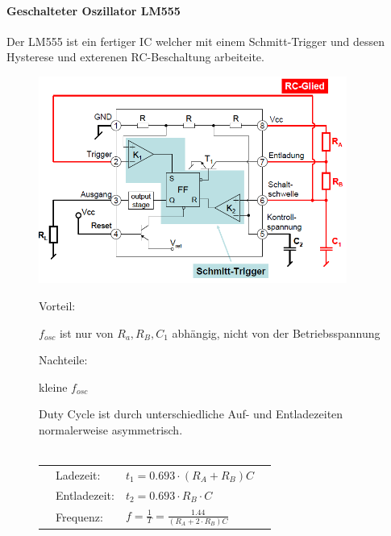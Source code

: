 \FloatBarrier
\paragraph{Geschalteter Oszillator LM555}
Der LM555 ist ein fertiger IC welcher  mit einem Schmitt-Trigger und dessen Hysterese und exterenen RC-Beschaltung arbeiteite.
\begin{figure}[h!]
	\begin{minipage}{0.5\textwidth} 
	\includegraphics[width=0.9\textwidth]{images/LM555}
	\end{minipage}
	\begin{minipage}{0.4\textwidth}
	  \begin{compactitem}
        \item Vorteil:
        \begin{compactitem}
           \item $f_{osc}$ ist nur von $R_a, R_B, C_1$ abhängig, nicht von der  Betriebsspannung
        \end{compactitem}
        \item Nachteile:
        \begin{compactitem}
           \item kleine $f_{osc}$
           \item Duty Cycle ist durch unterschiedliche Auf- und Entladezeiten normalerweise asymmetrisch.\\\
        \end{compactitem}
      \end{compactitem}
      \begin{listliketab}
    \begin{tabular}{Llll}
           & Ladezeit:             & $t_1=0.693\cdot(R_A+R_B)C$    \\
           & Entladezeit:          & $t_2=0.693\cdot R_B \cdot C$   \\
           &  Frequenz:             & $f=\frac{1}{T}=\frac{1.44}{(R_A+2\cdot R_B)C}$    \\
    \end{tabular}
\end{listliketab}
	\end{minipage}
\end{figure}

